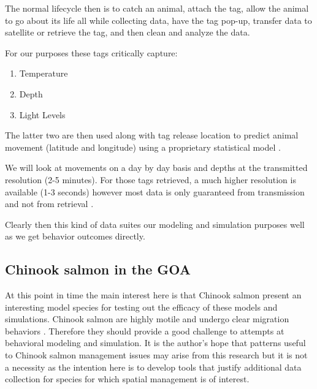\documentclass[11pt]{article}
\begin{document}
The normal lifecycle then is to catch an animal, attach the tag, allow the animal to go about its life all while collecting data, have the tag pop-up, transfer data to satellite or retrieve the tag, and then clean and analyze the data. \newline

For our purposes these tags critically capture:

\begin{enumerate}
\item Temperature
\item Depth
\item Light Levels
\end{enumerate}

The latter two are then used along with tag release location to predict animal movement (latitude and longitude) using a proprietary statistical model \citep{PSAT}. 

We will look at movements on a day by day basis and depths at the transmitted resolution (2-5 minutes). For those tags retrieved, a much higher resolution is available (1-3 seconds) however most data is only guaranteed from transmission and not from retrieval \citep{PSAT}. 
\newline

Clearly then this kind of data suites our modeling and simulation purposes well as we get behavior outcomes directly. 

\subsection{Chinook salmon in the GOA}

At this point in time the main interest here is that Chinook salmon present an interesting model species for testing out the efficacy of these models and simulations. Chinook salmon are highly motile and undergo clear migration behaviors \citep{tucker2019} \citep{langan2024}. Therefore they should provide a good challenge to attempts at behavioral modeling and simulation. It is the author's hope that patterns useful to Chinook salmon management issues may arise from this research but it is not a necessity as the intention here is to develop tools that justify additional data collection for species for which spatial management is of interest. 
\end{document}
